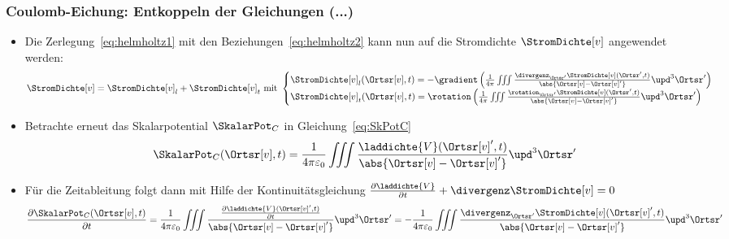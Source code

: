     \begin{frame}
  \frametitle{Coulomb-Eichung: Entkoppeln der Gleichungen (...)}
  \begin{itemize}[<+->]
  \item Die Zerlegung~\eqref{eq:helmholtz1} mit den Beziehungen~\eqref{eq:helmholtz2} kann nun auf die Stromdichte $\StromDichte[v]$ angewendet werden:
    \begin{equation}
      \StromDichte[v] = \StromDichte[v]_l + \StromDichte[v]_t \text{ mit }
      \begin{cases}
        \StromDichte[v]_l (\Ortsr[v], t) = -\gradient \left( \frac{1}{4\pi} \iiint \frac{\divergenz_{\Ortsr^\prime}\StromDichte[v](\Ortsr^\prime, t)}{\abs{\Ortsr[v]-\Ortsr[v]^\prime}} \upd^3\Ortsr^\prime \right)\\
        \StromDichte[v]_t (\Ortsr[v], t) = \rotation \left( \frac{1}{4\pi} \iiint \frac{\rotation_{\Ortsr^\prime}\StromDichte[v](\Ortsr^\prime, t)}{\abs{\Ortsr[v]-\Ortsr[v]^\prime}} \upd^3\Ortsr^\prime \right) 
        
      \end{cases}
      \label{eq:ZerlegungJ}
      \end{equation}
    \item Betrachte erneut das Skalarpotential $\SkalarPot_C$ in Gleichung~\eqref{eq:SkPotC}
      \begin{equation*}
        \SkalarPot_C (\Ortsr[v], t) = \frac{1}{4\pi\varepsilon_0} \iiint \frac{\laddichte{V}(\Ortsr[v]^\prime, t)}{\abs{\Ortsr[v]-\Ortsr[v]^\prime}} \upd^3\Ortsr^\prime
      \end{equation*}
      \item Für die Zeitableitung folgt dann mit Hilfe der \alert{Kontinuitätsgleichung} $\frac{\partial \laddichte{V}}{\partial t} + \divergenz \StromDichte[v] = 0$
        \begin{equation}
          \frac{\partial \SkalarPot_C (\Ortsr[v], t)}{\partial t} = \frac{1}{4\pi\varepsilon_0} \iiint \frac{\frac{\partial \laddichte{V}(\Ortsr[v]^\prime, t)}{\partial t}}{\abs{\Ortsr[v]-\Ortsr[v]^\prime}} \upd^3\Ortsr^\prime    =
          - \frac{1}{4\pi\varepsilon_0} \iiint \frac{\divergenz_{\Ortsr^\prime} \StromDichte[v](\Ortsr[v]^\prime, t)}{\abs{\Ortsr[v]-\Ortsr[v]^\prime}} \upd^3\Ortsr^\prime       \label{eq:Abl_t_SkalarPot}
          \end{equation}
      \end{itemize}
  \end{frame}


